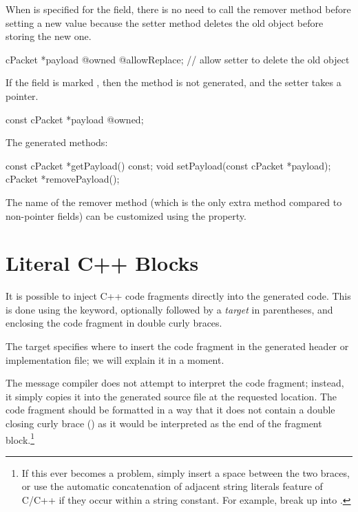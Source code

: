 When  is specified for the field, there is no need to call
the remover method before setting a new value because the setter method deletes
the old object before storing the new one.

\begin{msg}
cPacket *payload @owned @allowReplace; // allow setter to delete the old object
\end{msg}

If the field is marked , then the  method
is not generated, and the setter takes a  pointer.

\begin{msg}
const cPacket *payload @owned;
\end{msg}

The generated methods:

\begin{cpp}
const cPacket *getPayload() const;
void setPayload(const cPacket *payload);
cPacket *removePayload();
\end{cpp}


The name of the remover method (which is the only extra method compared to
non-pointer fields) can be customized using the  property.


\section{Literal C++ Blocks}
\label{sec:msg-defs:cplusplus-blocks}

It is possible to inject C++ code fragments directly into the generated code.
This is done using the  keyword, optionally followed by a
\textit{target} in parentheses, and enclosing the code fragment in double curly
braces.

The target specifies where to insert the code fragment in the generated header
or implementation file; we will explain it in a moment.

The message compiler does not attempt to interpret the code fragment; instead,
it simply copies it into the generated source file at the requested location.
The code fragment should be formatted in a way that it does not contain a double
closing curly brace (\ttt{\}\}}) as it would be interpreted as the end of the
fragment block.\footnote{If this ever becomes a problem, simply insert a space
between the two braces, or use the automatic concatenation of adjacent string
literals feature of C/C++ if they occur within a string constant. For example,
break up  into .}

